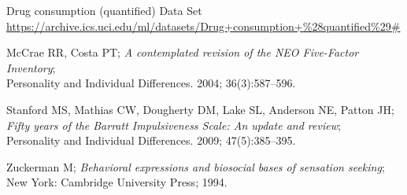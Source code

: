 \documentclass[a4paper,twocolumn]{article}
\begin{document}
\begin{thebibliography}{9}
	
Drug consumption (quantified) Data Set\\
{\small \url{https://archive.ics.uci.edu/ml/datasets/Drug+consumption+\%28quantified\%29#}}%
	
McCrae RR, Costa PT; \emph{A contemplated revision of the NEO Five-Factor
Inventory};\\
Personality and Individual Differences. 2004; 36(3):587–596.
	
Stanford MS, Mathias CW, Dougherty DM, Lake SL, Anderson NE, Patton JH; \emph{Fifty years of the Barratt Impulsiveness Scale: An update and review};\\
Personality and Individual Differences. 2009; 47(5):385–395.

Zuckerman M; \emph{Behavioral expressions and biosocial bases of sensation seeking};\\
New York: Cambridge University Press; 1994.


\end{thebibliography}
\end{document}
